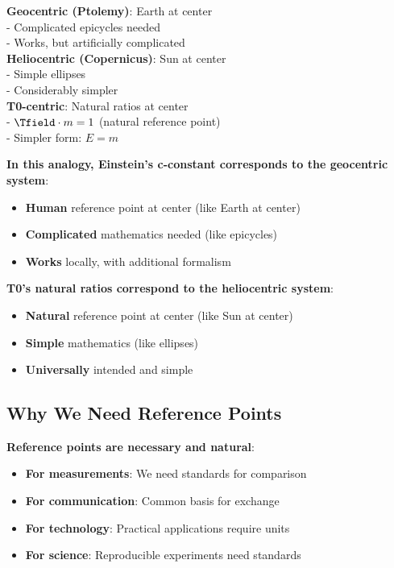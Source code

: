 	\begin{tcolorbox}[colback=blue!5!white,colframe=blue!75!black,title=The Change of Reference Point: From Earth $\rightarrow$ Sun $\rightarrow$ Nature]
		\textbf{Geocentric (Ptolemy)}: Earth at center \\
		- Complicated epicycles needed \\
		- Works, but artificially complicated \\
		
		\textbf{Heliocentric (Copernicus)}: Sun at center \\
		- Simple ellipses \\
		- Considerably simpler \\
		
		\textbf{T0-centric}: Natural ratios at center \\
		- $\Tfield \cdot m = 1$ (natural reference point) \\
		- Simpler form: $E = m$
	\end{tcolorbox}
	
	\textbf{In this analogy, Einstein's c-constant corresponds to the geocentric system}:
	\begin{itemize}
		\item \textbf{Human} reference point at center (like Earth at center)
		\item \textbf{Complicated} mathematics needed (like epicycles)
		\item \textbf{Works} locally, with additional formalism
	\end{itemize}
	
	\textbf{T0's natural ratios correspond to the heliocentric system}:
	\begin{itemize}
		\item \textbf{Natural} reference point at center (like Sun at center)
		\item \textbf{Simple} mathematics (like ellipses)
		\item \textbf{Universally} intended and simple
	\end{itemize}
	
	\subsection{Why We Need Reference Points}
	
	\textbf{Reference points are necessary and natural}:
	\begin{itemize}
		\item \textbf{For measurements}: We need standards for comparison
		\item \textbf{For communication}: Common basis for exchange
		\item \textbf{For technology}: Practical applications require units
		\item \textbf{For science}: Reproducible experiments need standards
	\end{itemize}
	
